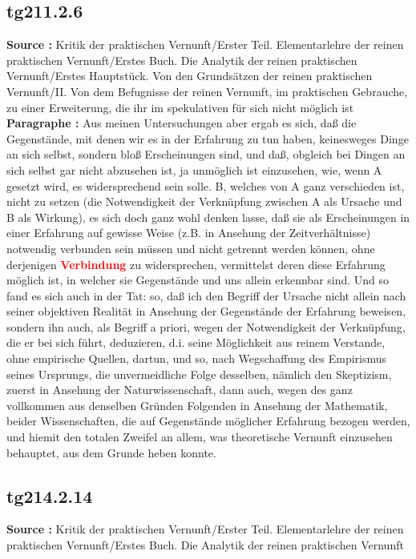 \documentclass[a4paper,12pt,twoside]{book}
\newcommand{\match}[1]{\textcolor{red}{\textbf{#1}}}
\begin{document}
	\subsection*{tg211.2.6} 
	\textbf{Source : }Kritik der praktischen Vernunft/Erster Teil. Elementarlehre der reinen praktischen Vernunft/Erstes Buch. Die Analytik der reinen praktischen Vernunft/Erstes Hauptstück. Von den Grundsätzen der reinen praktischen Vernunft/II. Von dem Befugnisse der reinen Vernunft, im praktischen Gebrauche, zu einer Erweiterung, die ihr im spekulativen für sich nicht möglich ist\\  
	
	\textbf{Paragraphe : }Aus meinen Untersuchungen aber ergab es sich, daß die Gegenstände, mit denen wir es in der Erfahrung zu tun haben, keinesweges Dinge an sich selbst, sondern bloß Erscheinungen sind, und daß, obgleich bei Dingen an sich selbst gar nicht abzusehen ist, ja unmöglich ist einzusehen, wie, wenn A gesetzt wird, es widersprechend sein solle. B, welches von A ganz verschieden ist, nicht zu setzen (die Notwendigkeit der Verknüpfung zwischen A als Ursache und B als Wirkung), es sich doch ganz wohl denken lasse, daß sie als Erscheinungen in einer Erfahrung auf gewisse Weise (z.B. in Ansehung der Zeitverhältnisse) notwendig verbunden sein müssen und nicht getrennt werden können, ohne derjenigen \match{Verbindung} zu widersprechen, vermittelst deren diese Erfahrung möglich ist, in welcher sie Gegenstände und uns allein erkennbar sind. Und so fand es sich auch in der Tat: so, daß ich den Begriff der Ursache nicht allein nach seiner objektiven Realität in Ansehung der Gegenstände der Erfahrung beweisen, sondern ihn auch, als Begriff a priori, wegen der Notwendigkeit der Verknüpfung, die er bei sich führt, deduzieren, d.i. seine Möglichkeit aus reinem Verstande, ohne empirische Quellen, dartun, und so, nach Wegschaffung des Empirismus seines Ursprungs, die unvermeidliche Folge desselben, nämlich den Skeptizism, zuerst in Ansehung der Naturwissenschaft, dann auch, wegen des ganz vollkommen aus denselben Gründen Folgenden in Ansehung der Mathematik, beider Wissenschaften, die auf Gegenstände möglicher Erfahrung bezogen werden, und hiemit den totalen Zweifel an allem, was theoretische Vernunft einzusehen behauptet, aus dem Grunde heben konnte. 
	
	\subsection*{tg214.2.14} 
	\textbf{Source : }Kritik der praktischen Vernunft/Erster Teil. Elementarlehre der reinen praktischen Vernunft/Erstes Buch. Die Analytik der reinen praktischen Vernunft\\  
	
\end{document}
